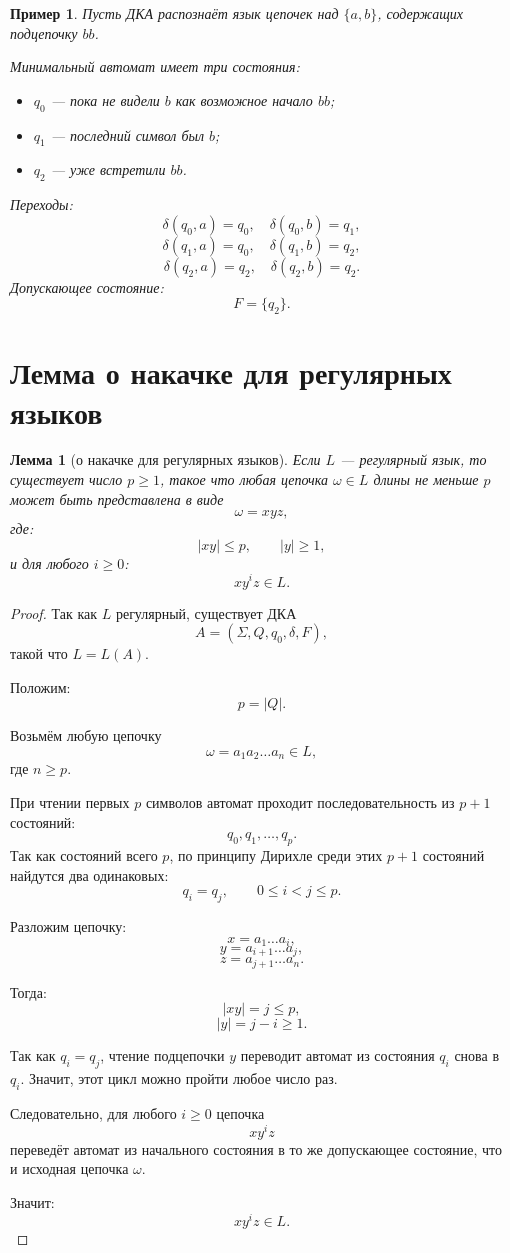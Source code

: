 \documentclass[12pt,a4paper]{article}
\newtheorem{lemma}{Лемма}
\newtheorem{example}{Пример}
\begin{document}
\begin{example}
Пусть ДКА распознаёт язык цепочек над $\{a,b\}$, содержащих подцепочку $bb$.

Минимальный автомат имеет три состояния:
\begin{itemize}
    \item $q_0$ --- пока не видели $b$ как возможное начало $bb$;
    \item $q_1$ --- последний символ был $b$;
    \item $q_2$ --- уже встретили $bb$.
\end{itemize}

Переходы:
\[
\delta(q_0,a)=q_0,\quad \delta(q_0,b)=q_1,
\]
\[
\delta(q_1,a)=q_0,\quad \delta(q_1,b)=q_2,
\]
\[
\delta(q_2,a)=q_2,\quad \delta(q_2,b)=q_2.
\]
Допускающее состояние:
\[
F=\{q_2\}.
\]
\end{example}

\section{Лемма о накачке для регулярных языков}

\begin{lemma}[о накачке для регулярных языков]
Если $L$ --- регулярный язык, то существует число $p\ge 1$, такое что любая цепочка $\omega\in L$ длины не меньше $p$ может быть представлена в виде
\[
\omega=xyz,
\]
где:
\[
|xy|\le p,\qquad |y|\ge 1,
\]
и для любого $i\ge 0$:
\[
xy^i z\in L.
\]
\end{lemma}

\begin{proof}
Так как $L$ регулярный, существует ДКА
\[
A=(\Sigma,Q,q_0,\delta,F),
\]
такой что $L=L(A)$.

Положим:
\[
p=|Q|.
\]

Возьмём любую цепочку
\[
\omega=a_1a_2\ldots a_n\in L,
\]
где $n\ge p$.

При чтении первых $p$ символов автомат проходит последовательность из $p+1$ состояний:
\[
q_0,q_1,\ldots,q_p.
\]
Так как состояний всего $p$, по принципу Дирихле среди этих $p+1$ состояний найдутся два одинаковых:
\[
q_i=q_j,\qquad 0\le i<j\le p.
\]

Разложим цепочку:
\[
x=a_1\ldots a_i,
\]
\[
y=a_{i+1}\ldots a_j,
\]
\[
z=a_{j+1}\ldots a_n.
\]

Тогда:
\[
|xy|=j\le p,
\]
\[
|y|=j-i\ge 1.
\]

Так как $q_i=q_j$, чтение подцепочки $y$ переводит автомат из состояния $q_i$ снова в $q_i$. Значит, этот цикл можно пройти любое число раз.

Следовательно, для любого $i\ge 0$ цепочка
\[
xy^i z
\]
переведёт автомат из начального состояния в то же допускающее состояние, что и исходная цепочка $\omega$.

Значит:
\[
xy^i z\in L.
\]
\end{proof}
\end{document}
